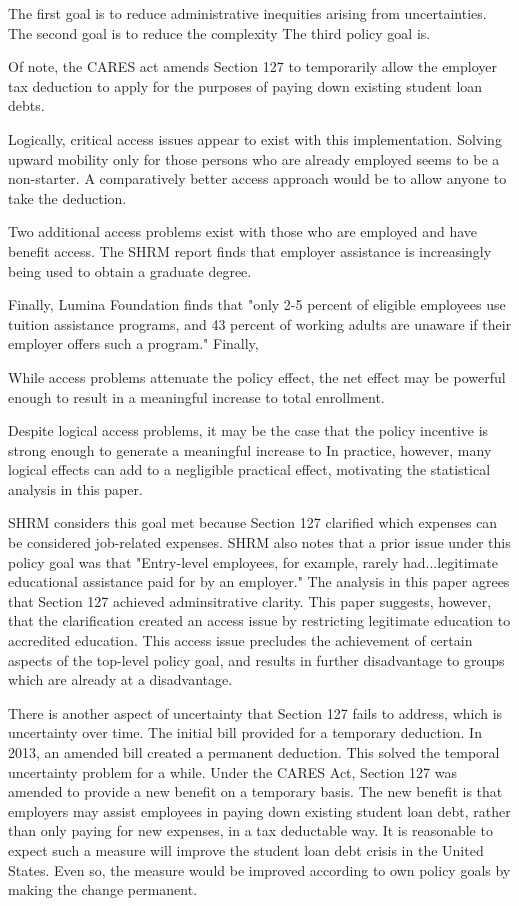\documentclass[review]{elsarticle}
\begin{document}

The first goal is to reduce administrative inequities arising from uncertainties.
The second goal is to reduce the complexity
The third policy goal is.

Of note, the CARES act amends Section 127 to temporarily allow the employer tax deduction to apply for the purposes of paying down existing student loan debts.

Logically, critical access issues appear to exist with this implementation.
Solving upward mobility only for those persons who are already employed seems to be a non-starter.
A comparatively better access approach would be to allow anyone to take the deduction.

Two additional access problems exist with those who are employed and have benefit access.
The SHRM report finds that employer assistance is increasingly being used to obtain a graduate degree.


Finally, Lumina Foundation finds that
"only 2-5 percent of eligible employees use tuition assistance programs,
and 43 percent of working adults are unaware if their employer offers such a program."
Finally,

While access problems attenuate the policy effect,
the net effect may be powerful enough to result in a meaningful increase to total enrollment.

Despite logical access problems,
it may be the case that the policy incentive is strong enough to generate a meaningful increase to
In practice, however, many logical effects can add to a negligible practical effect,
motivating the statistical analysis in this paper.


SHRM considers this goal met because Section 127 clarified which expenses can be considered job-related expenses.
SHRM also notes that a prior issue under this policy goal was that
"Entry-level employees, for example, rarely had...legitimate educational assistance paid for by an employer."
The analysis in this paper agrees that Section 127 achieved adminsitrative clarity.
This paper suggests, however, that the clarification created an access issue by restricting legitimate education to accredited education.
This access issue precludes the achievement of certain aspects of the top-level policy goal,
and results in further disadvantage to groups which are already at a disadvantage.

There is another aspect of uncertainty that Section 127 fails to address, which is uncertainty over time.
The initial bill provided for a temporary deduction.
In 2013, an amended bill created a permanent deduction\cite{baldwin_2013}.
This solved the temporal uncertainty problem for a while.
Under the CARES Act, Section 127 was amended to provide a new benefit on a temporary basis\cite{schiavo_2020}.
The new benefit is that employers may assist employees in paying down existing student loan debt,
rather than only paying for new expenses, in a tax deductable way.
It is reasonable to expect such a measure will improve the student loan debt crisis in the United States.
Even so, the measure would be improved according to own policy goals by making the change permanent.
\end{document}
